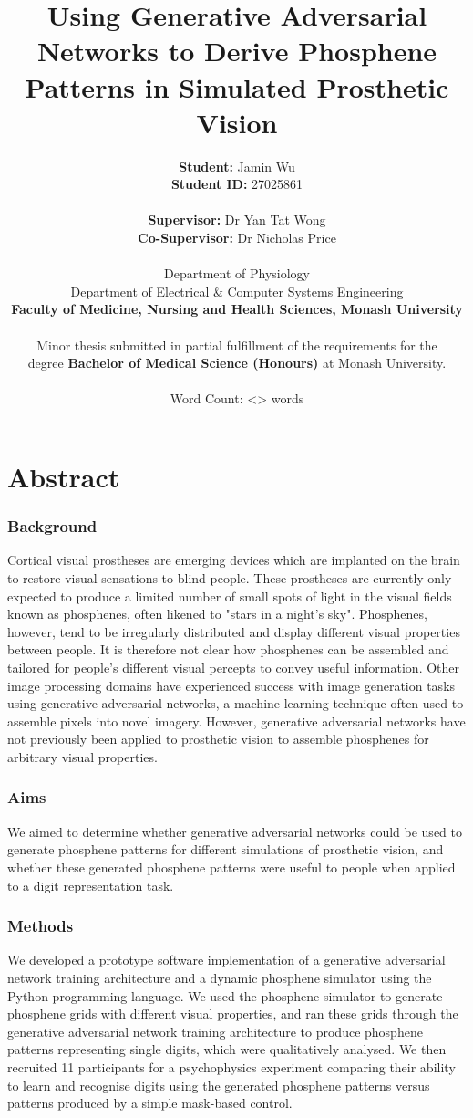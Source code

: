 \documentclass[a4paper,11pt,openany]{book}
\author{\textbf{Student:} Jamin Wu \\ \textbf{Student ID:} 27025861 \\ \\ \textbf{Supervisor:} Dr Yan Tat Wong \\ \textbf{Co-Supervisor:} Dr Nicholas Price \\ \\ Department of Physiology \\ Department of Electrical \& Computer Systems Engineering \\ \textbf{Faculty of Medicine, Nursing and Health Sciences, Monash University} \\ \\ Minor thesis submitted in partial fulfillment of the requirements for the \\ degree \textbf{Bachelor of Medical Science (Honours)} at Monash University. \\ \\ Word Count: <> words}
\date{}
\title{\textbf{Using Generative Adversarial Networks to Derive Phosphene Patterns in Simulated Prosthetic Vision}}
\begin{document}
\maketitle
\clearpage

\section*{Abstract}

\subsubsection*{Background}
Cortical visual prostheses are emerging devices which are implanted on the brain to restore visual sensations to blind people.
These prostheses are currently only expected to produce a limited number of small spots of light in the visual fields known as phosphenes, often likened to "stars in a night's sky".
Phosphenes, however, tend to be irregularly distributed and display different visual properties between people.
It is therefore not clear how phosphenes can be assembled and tailored for people's different visual percepts to convey useful information.
Other image processing domains have experienced success with image generation tasks using generative adversarial networks, a machine learning technique often used to assemble pixels into novel imagery.
However, generative adversarial networks have not previously been applied to prosthetic vision to assemble phosphenes for arbitrary visual properties.

\subsubsection*{Aims}
We aimed to determine whether generative adversarial networks could be used to generate phosphene patterns for different simulations of prosthetic vision, and whether these generated phosphene patterns were useful to people when applied to a digit representation task.

\subsubsection*{Methods}
We developed a prototype software implementation of a generative adversarial network training architecture and a dynamic phosphene simulator using the Python programming language.
We used the phosphene simulator to generate phosphene grids with different visual properties, and ran these grids through the generative adversarial network training architecture to produce phosphene patterns representing single digits, which were qualitatively analysed.
We then recruited 11 participants for a psychophysics experiment comparing their ability to learn and recognise digits using the generated phosphene patterns versus patterns produced by a simple mask-based control.
\end{document}
